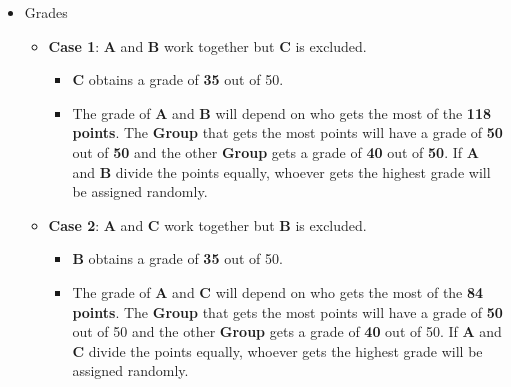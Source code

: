 \documentclass[
  ignorenonframetext,
]{beamer}
\providecommand{\tightlist}{%
  \setlength{\itemsep}{0pt}\setlength{\parskip}{0pt}}\usepackage{longtable,booktabs,array}
\begin{document}
\begin{frame}{}
\label{section-7}
\begin{itemize}
\item
  Grades

  \begin{itemize}
  \item
    \textbf{Case 1}: \textbf{A} and \textbf{B} work together but
    \textbf{C} is excluded.

    \begin{itemize}
    \tightlist
    \item
      \textbf{C} obtains a grade of \textbf{35} out of 50.
    \item
      The grade of \textbf{A} and \textbf{B} will depend on who gets the
      most of the \textbf{118 points}. The \textbf{Group} that gets the
      most points will have a grade of \textbf{50} out of \textbf{50}
      and the other \textbf{Group} gets a grade of \textbf{40} out of
      \textbf{50}. If \textbf{A} and \textbf{B} divide the points
      equally, whoever gets the highest grade will be assigned randomly.
    \end{itemize}
  \item
    \textbf{Case 2}: \textbf{A} and \textbf{C} work together but
    \textbf{B} is excluded.

    \begin{itemize}
    \tightlist
    \item
      \textbf{B} obtains a grade of \textbf{35} out of 50.
    \item
      The grade of \textbf{A} and \textbf{C} will depend on who gets the
      most of the \textbf{84 points}. The \textbf{Group} that gets the
      most points will have a grade of \textbf{50} out of 50 and the
      other \textbf{Group} gets a grade of \textbf{40} out of 50. If
      \textbf{A} and \textbf{C} divide the points equally, whoever gets
      the highest grade will be assigned randomly.
    \end{itemize}
  \end{itemize}
\end{itemize}
\end{frame}
\end{document}
